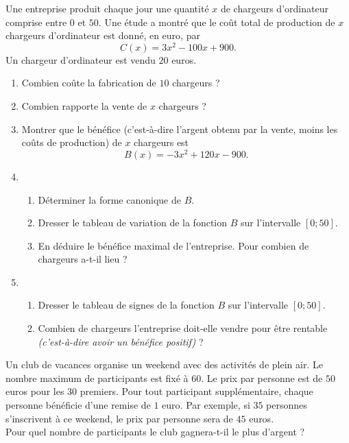 \documentclass[11pt]{article}
\begin{document}
\begin{exo}[$\star$]
  Une entreprise produit chaque jour une quantité $x$ de
chargeurs d'ordinateur comprise entre $0$ et $50$. Une étude a montré que le
coût total de production de $x$ chargeurs d'ordinateur est donné, en euro, par
\[
  C(x) = 3x^2-100x+900.
\]
Un chargeur d'ordinateur est vendu $20$ euros.
\begin{enumerate}
  \item Combien coûte la fabrication de $10$ chargeurs ?
  \item Combien rapporte la vente de $x$ chargeurs ?
  \item Montrer que le bénéfice (c'est-à-dire l'argent obtenu par la vente,
    moins les coûts de production) de $x$ chargeurs est
    \[
      B(x) = -3x^2+120x-900.
    \]
  \item \begin{enumerate}
      \item Déterminer la forme canonique de $B$.
      \item Dresser le tableau de variation de la fonction $B$ sur l'intervalle
        $\left[ 0; 50 \right]$.
      \item En déduire le bénéfice maximal de l'entreprise. Pour combien de
        chargeurs a-t-il lieu ?
    \end{enumerate}
  \item \begin{enumerate}
      \item Dresser le tableau de signes de la fonction $B$ sur l'intervalle $\left[
    0;50 \right]$.
  \item Combien de chargeurs l'entreprise doit-elle vendre pour être rentable
    \emph{(c'est-à-dire avoir un bénéfice positif)} ?
    \end{enumerate}
\end{enumerate}
\end{exo}

\begin{exo}[$\star\star$]
  Un club de vacances organise un weekend avec des
activités de plein air. Le nombre maximum de participants est fixé à $60$. Le
prix par personne est de $50$ euros pour les $30$ premiers. Pour tout participant
supplémentaire, chaque personne bénéficie d'une remise de $1$ euro. Par exemple, si
$35$ personnes s'inscrivent à ce weekend, le prix par personne sera de $45$
euros.\\
Pour quel nombre de participants le club gagnera-t-il le plus d'argent ?
\end{exo}
\end{document}
